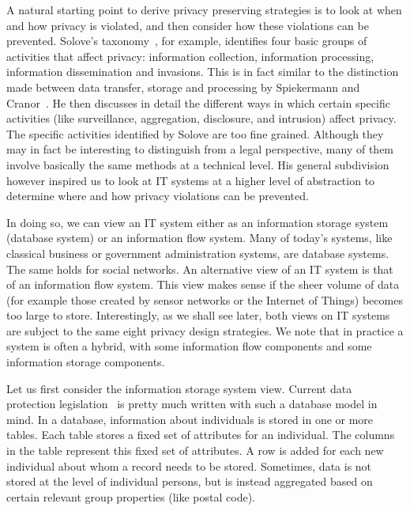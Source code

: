 A natural starting point to derive privacy preserving strategies is to look at when and how privacy is violated, and then consider how these violations can be prevented. Solove's taxonomy~\cite{solove2006taxonomy}, for example, identifies four basic groups of activities that affect privacy: information collection, information processing, information dissemination and invasions.
This is in fact similar to the distinction made between data transfer, storage and processing by Spiekermann and Cranor~\cite{DBLP:journals/tse/SpiekermannC09}. He then discusses in detail the different ways in which certain specific activities (like surveillance, aggregation, disclosure, and intrusion) affect privacy. The specific activities identified by Solove are too fine grained. Although they may in fact be interesting to distinguish from a legal perspective, many of them involve basically the same methods at a technical level. His general subdivision however inspired us to look at IT systems at a higher level of abstraction to determine where and how privacy violations can be prevented.

In doing so, we can view an IT system either as an information storage system (\ie database system) or an information flow system. Many of today's systems, like classical business or government administration systems, are database systems. The same holds for social networks. An alternative view of an IT system is that of an information flow system. This view makes sense if the sheer volume of data (for example those created by sensor networks or the Internet of Things) becomes too large to store. Interestingly, as we shall see later, both views on IT systems are subject to the same eight privacy design strategies. We note that in practice a system is often a hybrid, with some information flow components and some information storage components.


Let us first consider the information storage system view. Current data protection legislation~\cite{ec-95-46} is pretty much written with such a database model in mind.
In a database, information about individuals is stored in one or more tables. Each table
stores a fixed set of attributes for an individual. The columns in the table represent this fixed set of attributes. A row is added for each new individual about whom a record
needs to be stored. Sometimes, data is not stored at the level of individual persons, but is instead aggregated based on certain relevant group properties (like postal code). 


